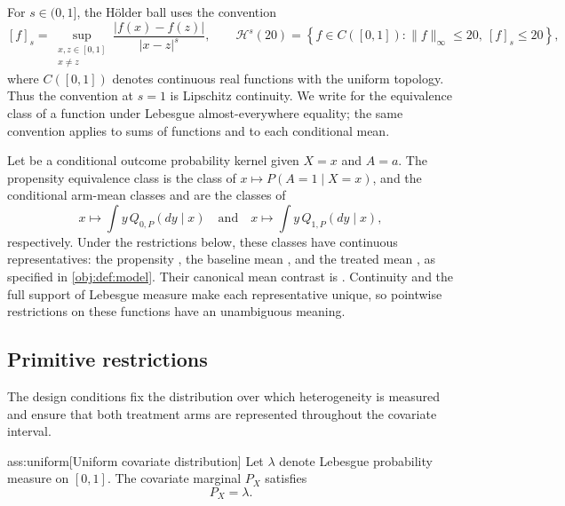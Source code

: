 \documentclass[11pt]{article}
\begin{document}
For \(s\in(0,1]\), the Hölder ball  uses the convention
\[
[f]_s
=
\sup_{\substack{x,z\in[0,1]\\x\ne z}}
\frac{|f(x)-f(z)|}{|x-z|^s},
\qquad
\mathcal H^s(20)
=
\left\{
f\in C([0,1]):
\|f\|_\infty\le20,\ [f]_s\le20
\right\},
\]
where \(C([0,1])\) denotes continuous real functions with the uniform topology. Thus the convention at \(s=1\) is Lipschitz continuity. We write  for the equivalence class of a function under Lebesgue almost-everywhere equality; the same convention applies to sums of functions and to each conditional mean.

Let  be a conditional outcome probability kernel given \(X=x\) and \(A=a\). The propensity equivalence class  is the class of \(x\mapsto P(A=1\mid X=x)\), and the conditional arm-mean classes  and  are the classes of
\[
x\longmapsto \int y\,Q_{0,P}(dy\mid x)
\quad\text{and}\quad
x\longmapsto \int y\,Q_{1,P}(dy\mid x),
\]
respectively. Under the restrictions below, these classes have continuous representatives: the propensity , the baseline mean , and the treated mean , as specified in \cref{obj:def:model}. Their canonical mean contrast is . Continuity and the full support of Lebesgue measure make each representative unique, so pointwise restrictions on these functions have an unambiguous meaning.

\subsection{Primitive restrictions}

The design conditions fix the distribution over which heterogeneity is measured and ensure that both treatment arms are represented throughout the covariate interval.

\begin{assumptionv}{ass:uniform}[Uniform covariate distribution]
Let \(\lambda\) denote Lebesgue probability measure on \([0,1]\). The covariate marginal \(P_X\) satisfies
\[
P_X=\lambda.
\]
\end{assumptionv}
\end{document}
